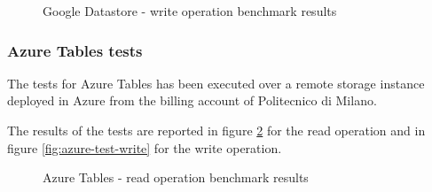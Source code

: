 \begin{figure}[tbh]
  \centering
  \caption{Google Datastore - write operation benchmark results}
  \label{fig:gae-test-write}
\end{figure} 
 
\subsubsection{Azure Tables tests}
The tests for Azure Tables has been executed over a remote storage instance deployed in Azure from the billing account of Politecnico di Milano.

\noindent The results of the tests are reported in figure \ref{fig:azure-test-read} for the read operation and in figure \ref{fig:azure-test-write} for the write operation.
 
\begin{figure}[tbh]
  \centering
  \caption{Azure Tables - read operation benchmark results}
  \label{fig:azure-test-read}
\end{figure} 

